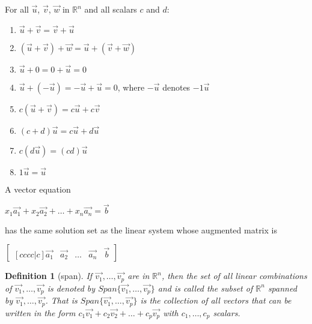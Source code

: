 \documentclass[oneside]{report}
\newtheorem{definition}{Definition}[section]
\begin{document}
For all $\vec{u}$, $\vec{v}$, $\vec{w}$ in $\mathbb{R}^n$ and all scalars $c$ and $d$:
\begin{enumerate}
  \item $\vec{u} + \vec{v} = \vec{v} + \vec{u}$
  \item $(\vec{u} + \vec{v}) + \vec{w} = \vec{u} + (\vec{v} + \vec{w})$
  \item $\vec{u} + 0 = 0 + \vec{u} = 0$
  \item $\vec{u} + (-\vec{u}) = -\vec{u} + \vec{u} = 0$, where $-\vec{u}$ denotes $-1\vec{u}$
  \item $c(\vec{u} + \vec{v}) = c\vec{u} + c\vec{v}$
  \item $(c + d)\vec{u} = c\vec{u} + d\vec{u}$
  \item $c(d\vec{u}) = (cd)\vec{u}$
  \item $1\vec{u} = \vec{u}$
\end{enumerate}

A vector equation

\begin{center}
  $x_1\vec{a_1} + x_2\vec{a_2} + \dots + x_n\vec{a_n} = \vec{b}$
\end{center}

has the same solution set as the linear system whose augmented matrix is

\begin{center}
   $\begin{bmatrix}[cccc|c]
      \vec{a_1} &\vec{a_2} &\dots &\vec{a_n} &\vec{b}
    \end{bmatrix}$
\end{center}

\begin{definition}[span]
  If $\vec{v_1},\dots,\vec{v_p}$ are in $\mathbb{R}^n$, then the set of all linear combinations of $\vec{v_1},\dots,\vec{v_p}$ is denoted by $Span\{\vec{v_1},\dots,\vec{v_p}\}$ and is called the subset of $\mathbb{R}^n$ spanned by $\vec{v_1},\dots,\vec{v_p}$. That is $Span\{\vec{v_1},\dots,\vec{v_p}\}$ is the collection of all vectors that can be written in the form $c_1\vec{v_1} + c_2\vec{v_2} + \dots + c_p\vec{v_p}$ with $c_1,\dots,c_p$ scalars.
\end{definition}
\end{document}
